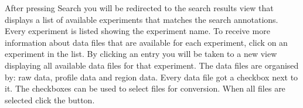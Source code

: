After pressing Search you will be  redirected to the search results view  that displays a list of available experiments that matches the search annotations. Every experiment is listed showing the experiment name. To receive more information about data files that are available for each experiment, click on an experiment in the list. By clicking an entry you will be taken to a new view displaying all available data files for that experiment. The data files are organised by: raw data, profile data and region data. Every data file got a checkbox next to it.  The checkboxes can be used to select files for conversion. When all files are selected click the  button.
